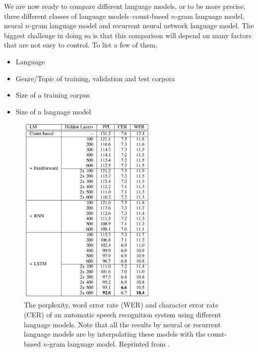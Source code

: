 \documentclass{report}
\begin{document}
We are now ready to compare different language models, or to be more precise,
three different classes of language models--count-based $n$-gram language model,
neural $n$-gram language model and recurrent neural network language model. The
biggest challenge in doing so is that this comparison will depend on many
factors that are not easy to control. To list a few of them,
\begin{itemize}
    \itemsep 0em
    \item Language
    \item Genre/Topic of training, validation and test corpora
    \item Size of a training corpus
    \item Size of a language model
\end{itemize}

\begin{figure}[ht]
    \centering
    \includegraphics[width=0.6\textwidth]{figures/sundermeyer1.png}

    \caption{
        The perplexity, word error rate (WER) and character error rate (CER) of
        an automatic speech recognition system using different language models.
        Note that all the results by neural or recurrent language models are by
        interpolating these models with the count-based $n$-gram language model.
        Reprinted from \cite{sundermeyer2015feedforward}.
    }
    \label{fig:sundermeyer1}
\end{figure}
\end{document}
